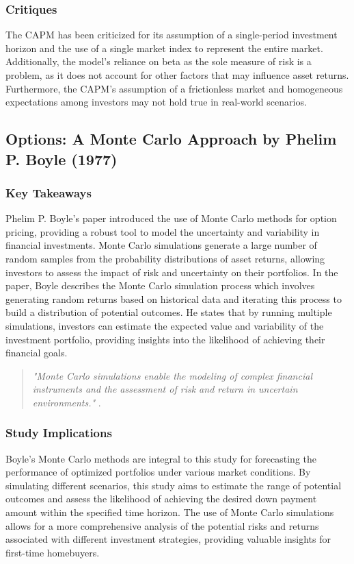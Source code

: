 \subsubsection{Critiques}
The CAPM has been criticized for its assumption of a single-period investment horizon and the use of a single market index to represent the entire market. Additionally, the model's reliance on beta as the sole measure of risk is a problem, as it does not account for other factors that may influence asset returns. Furthermore, the CAPM's assumption of a frictionless market and homogeneous expectations among investors may not hold true in real-world scenarios.






\subsection{Options: A Monte Carlo Approach by Phelim P. Boyle (1977)}

\subsubsection{Key Takeaways}
Phelim P. Boyle's paper introduced the use of Monte Carlo methods for option pricing, providing a robust tool to model the uncertainty and variability in financial investments. Monte Carlo simulations generate a large number of random samples from the probability distributions of asset returns, allowing investors to assess the impact of risk and uncertainty on their portfolios. In the paper, Boyle describes the Monte Carlo simulation process which involves generating random returns based on historical data and iterating this process to build a distribution of potential outcomes. He states that by running multiple simulations, investors can estimate the expected value and variability of the investment portfolio, providing insights into the likelihood of achieving their financial goals.

\begin{quote}
\textit{"Monte Carlo simulations enable the modeling of complex financial instruments and the assessment of risk and return in uncertain environments."} \citep{boyle1977options}.
\end{quote}

\subsubsection{Study Implications}
Boyle's Monte Carlo methods are integral to this study for forecasting the performance of optimized portfolios under various market conditions. By simulating different scenarios, this study aims to estimate the range of potential outcomes and assess the likelihood of achieving the desired down payment amount within the specified time horizon. The use of Monte Carlo simulations allows for a more comprehensive analysis of the potential risks and returns associated with different investment strategies, providing valuable insights for first-time homebuyers.

